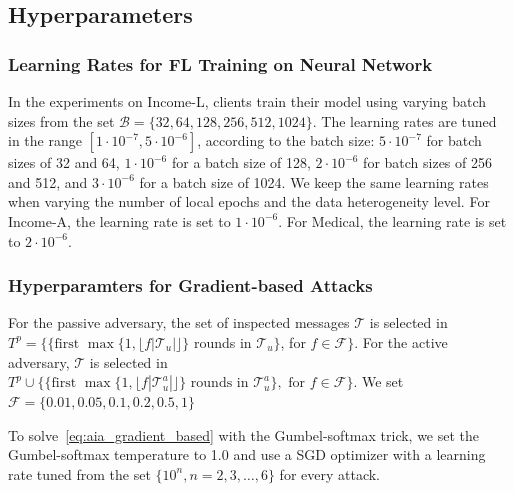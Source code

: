 \subsection{Hyperparameters}\label{app:hyperparameters}
\subsubsection{Learning Rates for FL Training on Neural Network}
In the experiments on Income-L, clients train their model using varying batch sizes from the set $\mathcal{B} = \{32, 64, 128, 256, 512, 1024\}$. The learning rates are tuned in the range $[1\cdot10^{-7}, 5\cdot 10^{-6}]$, according to the batch size: $5 \cdot 10^{-7}$ for batch sizes of 32 and 64, $1 \cdot 10^{-6}$ for a batch size of 128, $2 \cdot 10^{-6}$ for batch sizes of 256 and 512, and $3 \cdot 10^{-6}$ for a batch size of 1024. We keep the same learning rates when varying the number of local epochs and the data heterogeneity level.
For Income-A,  the learning rate is set to $1\cdot 10^{-6}$.
For Medical, the learning rate is set to $2\cdot10^{-6}$. \\
\subsubsection{Hyperparamters for Gradient-based Attacks}


 For the passive adversary, the set of inspected messages $\mathcal T$ is selected in  $T^p = \{ \{\text{first } \max\{1, \lfloor f |\mathcal{T}_u| \rfloor\}$  rounds in  $\mathcal{T}_u\}$, for  $f\in \mathcal{F}\}$. 
For the active adversary, $\mathcal T$ is selected in  $T^p \cup \{ \{\text{first } \max\{1, \lfloor f |\mathcal{T}^a_u|\rfloor\}  \text{ rounds in } \mathcal{T}^a_u\}, \text{ for } f\in \mathcal{F}\}$. We set $\mathcal{F} = \{ 0.01, 0.05, 0.1, 0.2, 0.5, 1\}$

To solve~\eqref{eq:aia_gradient_based} with the Gumbel-softmax trick, we set the Gumbel-softmax temperature to 1.0 and use a SGD optimizer with a learning rate tuned from the set $\{10^n, n= 2,3,\dots,6\}$ for every attack. 



